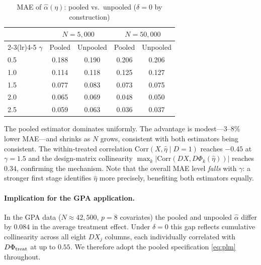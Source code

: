 \begin{table}[h]
  \centering
  \caption{MAE of $\hat\alpha(\eta)$: pooled vs.\ unpooled ($\delta = 0$ by construction)}
  \label{tab:pooling}
  \small
  \begin{tabular}{lcccc}
    \hline
    & \multicolumn{2}{c}{$N = 5{,}000$} & \multicolumn{2}{c}{$N = 50{,}000$} \\
    \cmidrule(lr){2-3}\cmidrule(lr){4-5}
    $\gamma$ & Pooled & Unpooled & Pooled & Unpooled \\
    \hline
    0.5 & 0.188 & 0.190 & 0.206 & 0.206 \\
    1.0 & 0.114 & 0.118 & 0.125 & 0.127 \\
    1.5 & 0.077 & 0.083 & 0.073 & 0.075 \\
    2.0 & 0.065 & 0.069 & 0.048 & 0.050 \\
    2.5 & 0.059 & 0.063 & 0.036 & 0.037 \\
    \hline
  \end{tabular}
\end{table}

The pooled estimator dominates uniformly.
The advantage is modest---3--8\% lower MAE---and shrinks as $N$ grows,
consistent with both estimators being consistent.
The within-treated correlation $\mathrm{Corr}(X, \hat\eta \mid D=1)$ reaches
$-0.45$ at $\gamma = 1.5$ and the design-matrix collinearity
$\max_k |\mathrm{Corr}(DX, D\Phi_k(\hat\eta))|$ reaches $0.34$,
confirming the mechanism.
Note that the overall MAE level \emph{falls} with $\gamma$: a stronger first
stage identifies $\hat\eta$ more precisely, benefiting both estimators equally.

\paragraph{Implication for the GPA application.}
In the GPA data ($N \approx 42{,}500$, $p = 8$ covariates) the pooled and
unpooled $\hat\alpha$ differ by $0.084$ in the average treatment effect.
Under $\delta = 0$ this gap reflects cumulative collinearity across all eight
$D X_j$ columns, each individually correlated with $D\Phi_{\rm treat}$ at up
to $0.55$.
We therefore adopt the pooled specification \eqref{eq:plm} throughout.
